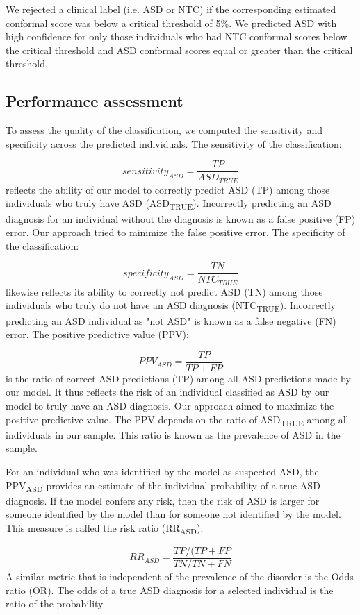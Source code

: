 \documentclass[9pt,lineno]{elife}
\begin{document}
We rejected a clinical label (i.e. ASD or NTC) if the corresponding estimated conformal score was below a critical threshold of 5\%. We predicted ASD with high confidence for only those individuals who had NTC conformal scores below the critical threshold and ASD conformal scores equal or greater than the critical threshold.


\subsection{Performance assessment}
To assess the quality of the classification, we computed the sensitivity and specificity across the predicted individuals. The sensitivity of the classification:

\[sensitivity_{ASD} = \frac{TP}{ASD_{TRUE}}\]
reflects the ability of our model to correctly predict ASD (TP) among those individuals who truly have ASD (ASD\textsubscript{TRUE}). Incorrectly predicting an ASD diagnosis for an individual without the diagnosis is known as a false positive (FP) error. Our approach tried to minimize the false positive error. The specificity of the classification: 

\[specificity_{ASD} = \frac{TN}{NTC_{TRUE}}\]
likewise reflects its ability to correctly not predict ASD (TN) among those individuals who truly do not have an ASD diagnosis (NTC\textsubscript{TRUE}). Incorrectly predicting an ASD individual as "not ASD" is known as a false negative (FN) error. The positive predictive value (PPV):

\[PPV_{ASD} = \frac{TP}{TP+FP}\]
is the ratio of correct ASD predictions (TP) among all ASD predictions made by our model. It thus reflects the risk of an individual classified as ASD by our model to truly have an ASD diagnosis. Our approach aimed to maximize the positive predictive value. The PPV depends on the ratio of ASD\textsubscript{TRUE} among all individuals in our sample. This ratio is known as the prevalence of ASD in the sample. 

For an individual who was identified by the model as suspected ASD, the PPV\textsubscript{ASD} provides an estimate of the individual probability of a true ASD diagnosis. If the model confers any risk, then the risk of ASD is larger for someone identified by the model than for someone not identified by the model. This measure is called the risk ratio (RR\textsubscript{ASD}):

\[RR_{ASD} = \frac{TP/(TP+FP}{TN/TN+FN}\]
A similar metric that is independent of the prevalence of the disorder is the Odds ratio (OR). The odds of a true ASD diagnosis for a selected individual is the ratio of the probability
\end{document}
